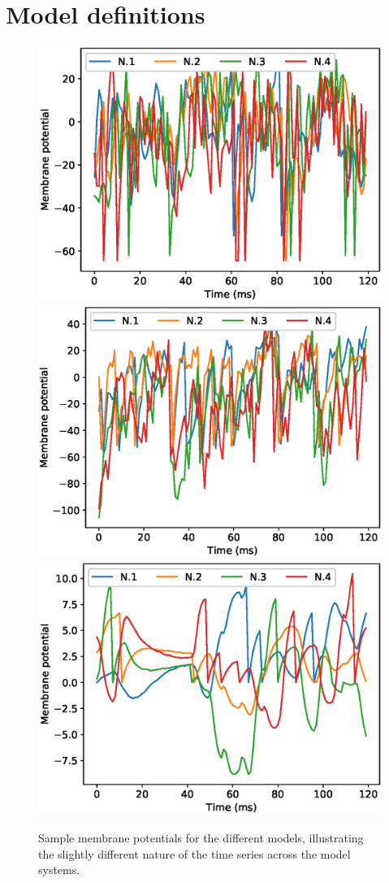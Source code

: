 \documentclass[mphil,deptreport,ianc]{infthesis} %
\begin{document}



\section{Model definitions}

\begin{figure}
    \centering
    \vskip -0.1in
    \includegraphics[width=0.49\columnwidth]{figures/samples/membrane_potentials/export_sample_LIF_white_noise.eps}
    \includegraphics[width=0.49\columnwidth]{figures/samples/membrane_potentials/export_sample_GLIF_white_noise.eps}
    \includegraphics[width=0.49\columnwidth]{figures/samples/membrane_potentials/export_sample_mesoGIF_white_noise.eps}
    \vskip -0.1in
    \caption{Sample membrane potentials for the different models, illustrating the slightly different nature of the time series across the model systems.}
    \label{fig:membrane_potential_samples}
    \vskip -0.2in
\end{figure}
\end{document}
